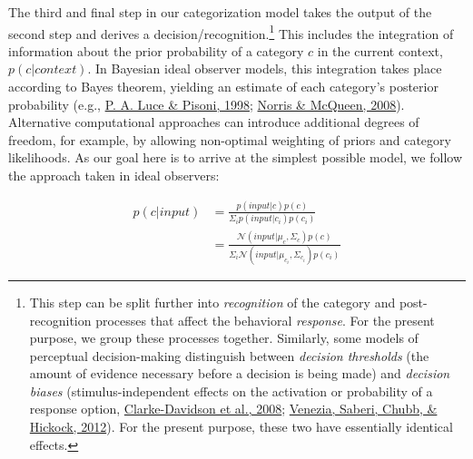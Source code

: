 \documentclass[
  11pt,
  english,
  man,floatsintext]{apa6}
\begin{document}
The third and final step in our categorization model takes the output of the second step and derives a decision/recognition.\footnote{This step can be split further into \emph{recognition} of the category and post-recognition processes that affect the behavioral \emph{response}. For the present purpose, we group these processes together. Similarly, some models of perceptual decision-making distinguish between \emph{decision thresholds} (the amount of evidence necessary before a decision is being made) and \emph{decision biases} (stimulus-independent effects on the activation or probability of a response option, \protect\hyperlink{ref-clarkedavidson2008}{Clarke-Davidson et al., 2008}; \protect\hyperlink{ref-venezia2012}{Venezia, Saberi, Chubb, \& Hickock, 2012}). For the present purpose, these two have essentially identical effects.} This includes the integration of information about the prior probability of a category \(c\) in the current context, \(p(c | context)\). In Bayesian ideal observer models, this integration takes place according to Bayes theorem, yielding an estimate of each category's posterior probability (e.g., \protect\hyperlink{ref-luce-pisoni1998}{P. A. Luce \& Pisoni, 1998}; \protect\hyperlink{ref-norris-mcqueen2008}{Norris \& McQueen, 2008}). Alternative computational approaches can introduce additional degrees of freedom, for example, by allowing non-optimal weighting of priors and category likelihoods. As our goal here is to arrive at the simplest possible model, we follow the approach taken in ideal observers:

\begin{equation}\label{eq:posterior-probability}
\begin{split}
p(c | input) & = \frac{p(input | c) p(c)}{\Sigma_i p(input | c_i) p(c_i)} \\
                    & = \frac{\mathcal{N}\!(input | \mu_c, \Sigma_c) p(c)}{\Sigma_i \mathcal{N}\!(input | \mu_{c_i}, \Sigma_{c_i}) p(c_i)}
\end{split}
\end{equation}
\end{document}

